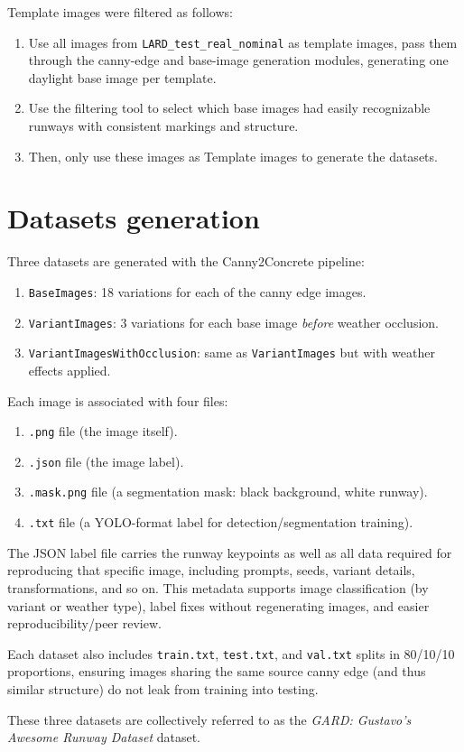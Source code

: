 Template images were filtered as follows:
\begin{enumerate}
\item Use all images from \texttt{LARD\_test\_real\_nominal} as template images, pass them through the canny-edge and base-image generation modules, generating one daylight base image per template.
\item Use the filtering tool to select which base images had easily recognizable runways with consistent markings and structure.
\item Then, only use these images as Template images to generate the datasets.
\end{enumerate}

\section{Datasets generation}

Three datasets are generated with the Canny2Concrete pipeline:

\begin{enumerate}
\item \texttt{BaseImages}: 18 variations for each of the canny edge images.
\item \texttt{VariantImages}: 3 variations for each base image \emph{before} weather occlusion.
\item \texttt{VariantImagesWithOcclusion}: same as \texttt{VariantImages} but with weather effects applied.
\end{enumerate}

Each image is associated with four files:
\begin{enumerate}
\item \texttt{.png} file (the image itself).
\item \texttt{.json} file (the image label).
\item \texttt{.mask.png} file (a segmentation mask: black background, white runway).
\item \texttt{.txt} file (a YOLO-format label for detection/segmentation training).
\end{enumerate}

The JSON label file carries the runway keypoints as well as all data required for reproducing that specific image, including prompts, seeds, variant details, transformations, and so on. 
This metadata supports image classification (by variant or weather type), label fixes without regenerating images, and easier reproducibility/peer review.

Each dataset also includes \texttt{train.txt}, \texttt{test.txt}, and \texttt{val.txt} splits in 80/10/10 proportions, ensuring images sharing the same source canny edge (and thus similar structure) do not leak from training into testing.

These three datasets are collectively referred to as the \emph{GARD: Gustavo’s Awesome Runway Dataset} dataset.

